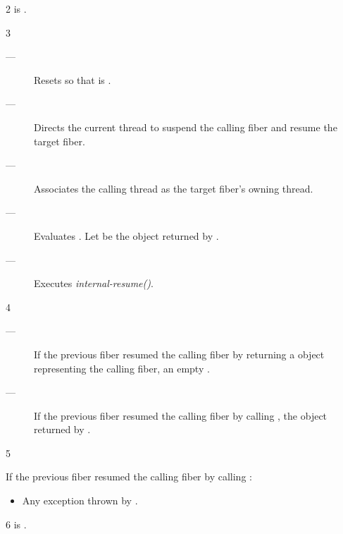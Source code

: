 2 \precond
\canresume is \true.

3 \effects
\begin{description}
    \item[---] Resets \state so that \emptyfn is \true.
    \item[---] Directs the current thread to suspend the calling fiber and resume
               the target fiber.
    \item[---] Associates the calling thread as the target fiber's owning thread.
    \item[---] Evaluates .
               Let  be the \fiber object returned by .
    \item[---] Executes \emph{internal-resume()}.
\end{description}

4 \returns

\begin{description}
    \item[---] If the previous fiber resumed the calling fiber by returning
          a \fiber object representing the calling fiber, an empty \fiber.
    \item[---] If the previous fiber resumed the calling fiber by
          calling , the \fiber object returned
          by .
\end{description}

5 \except

If the previous fiber resumed the calling fiber by calling :
\begin{itemize}
    \item Any exception thrown by .
\end{itemize}


6 \postcond
\emptyfn is \true.



